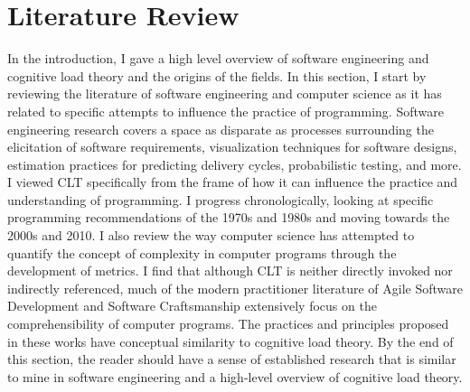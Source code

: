 \chapter{Literature Review}
\graphicspath{{./images/ch2/}}

In the introduction, I gave a high level overview of software engineering and cognitive load theory and the origins of the fields. In this section, I start by reviewing the literature of software engineering and computer science as it has related to specific attempts to influence the practice of programming. Software engineering research covers a space as disparate as processes surrounding the elicitation of software requirements, visualization techniques for software designs, estimation practices for predicting delivery cycles, probabilistic testing, and more.  I viewed CLT specifically from the frame of how it can influence the practice and understanding of programming. I progress chronologically, looking at specific programming recommendations of the 1970s and 1980s and moving towards the 2000s and 2010. I also review the way computer science has attempted to quantify the concept of complexity in computer programs through the development of metrics. I find that although CLT is neither directly invoked nor indirectly referenced, much of the modern practitioner literature of Agile Software Development and Software Craftsmanship \cite{McBreen2001} extensively focus on the comprehensibility of computer programs. The practices and principles proposed in these works have conceptual similarity to cognitive load theory. By the end of this section, the reader should have a sense of established research that is similar to mine in software engineering and a high-level overview of cognitive load theory.


